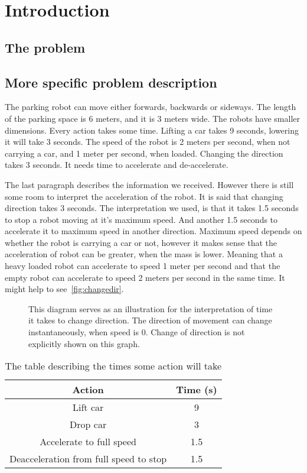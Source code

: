 \section{Introduction}
\subsection{The problem}
\subsection{More specific problem description}
The parking robot can move either forwards, backwards or sideways. The length of
the parking space is 6 meters, and it is 3 meters wide. The robots have smaller
dimensions. Every action takes some time. Lifting a car takes 9 seconds,
lowering it will take 3 seconds. The speed of the robot is 2 meters per second,
when not carrying a car, and 1 meter per second, when loaded. Changing the
direction takes 3 seconds. It needs time to accelerate and de-accelerate. 

The last paragraph describes the information we received. However there is still
some room to interpret the acceleration of the robot. It is said that changing
direction takes 3 seconds. The interpretation we used, is that it takes 1.5
seconds to stop a robot moving at it's maximum speed. And another 1.5 seconds to
accelerate it to maximum speed in another direction. Maximum speed depends on
whether the robot is carrying a car or not, however it makes sense that the
acceleration of robot can be greater, when the mass is lower. Meaning that a
heavy loaded robot can accelerate to speed 1 meter per second and that the empty
robot can accelerate to speed 2 meters per second in the same time. It might
help to see~\autoref{fig:changedir}.

\begin{figure}[h]
    
    \caption{This diagram serves as an illustration for the interpretation of
        time it takes to change direction. The direction of movement can change
        instantaneously, when speed is 0. Change of direction is not explicitly shown on
        this graph. }
    \label{fig:changedir}
\end{figure}

\begin{table}
    \begin{tabular}{| c | c |}
        \hline
        Action & Time (s)\\
        \hline
        Lift car & 9\\
        Drop car & 3\\
        Accelerate to full speed & 1.5\\
        Deacceleration from full speed to stop & 1.5\\
        \hline
    \end{tabular}
    \caption{The table describing the times some action will take}
    \label{tbl:times}
\end{table}
